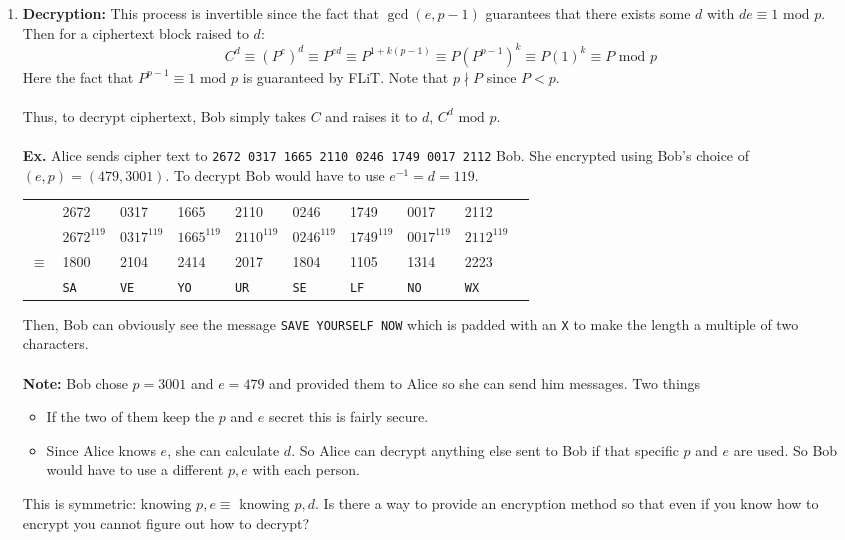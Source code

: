 \documentclass[class=article, crop=false]{standalone}
\begin{document}
\begin{enumerate}
\begin{enumerate}
		\item \textbf{Decryption:} This process is invertible since the fact that $\gcd(e, p-1)$
		guarantees that there exists some $d$ with $de \equiv 1 \mbox{ mod } p$.
		Then for a ciphertext block raised to $d$:
		$$C^d \equiv (P^e)^d \equiv P^{ed} \equiv P^{1+k(p-1)} \equiv P(P^{p-1})^k \equiv P(1)^k \equiv P\mbox{ mod }p$$
		Here the fact that $P^{p-1}\equiv 1\mbox{ mod } p$ is guaranteed by FLiT. Note that $p\nmid P$ since $P<p$. \\\\
		Thus, to decrypt ciphertext, Bob simply takes $C$ and raises it to $d$, $C^d\mbox{ mod }p$. \\\\
		\textbf{Ex.} Alice sends cipher text to \verb|2672 0317 1665 2110 0246 1749 0017 2112| Bob. She encrypted
		using Bob's choice of $(e,p)=(479, 3001)$. To decrypt Bob would have to use
		$e^{-1}=d=119$.
		\begin{table}[h!]
			\centering
			\begin{tabular}{c l l l l l l l l l}
				$ $& 2672& 0317& 1665& 2110& 0246& 1749& 0017& 2112 \\
				$ $& $2672^{119}$& $0317^{119}$& $1665^{119}$& $2110^{119}$& $0246^{119}$& $1749^{119}$& $0017^{119}$& $2112^{119}$ \\
				\hline
				$\equiv$& 1800& 2104& 2414& 2017& 1804& 1105& 1314& 2223 \\
				$ $& \verb|SA|& \verb|VE|& \verb|YO|& \verb|UR|& \verb|SE|& \verb|LF|& \verb|NO|& \verb|WX|
			\end{tabular}
		\end{table}
		Then, Bob can obviously see the message \verb|SAVE YOURSELF NOW| which is padded with an \verb|X| to make
		the length a multiple of two characters. \\\\
		\textbf{Note:} Bob chose $p=3001$ and $e=479$ and provided them to Alice so
		she can send him messages. Two things
		\begin{itemize}
			\item If the two of them keep the $p$ and $e$ secret this is fairly secure.
			\item Since Alice knows $e$, she can calculate $d$.
			So Alice can decrypt anything else sent to Bob if that specific $p$ and $e$ are used.
			So Bob would have to use a different $p,e$ with each person.
		\end{itemize}
		This is symmetric: knowing $p,e \equiv$ knowing $p,d$.
		Is there a way to provide an encryption method so that 
		even if you know how to encrypt you cannot figure out how to decrypt?
	\end{enumerate}
\end{enumerate}
\setcounter{subsection}{3}
\end{document}

